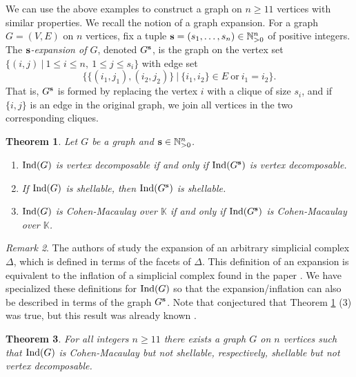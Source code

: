 \documentclass[12pt]{amsart}
\theoremstyle{plain}
\newtheorem{theorem}{Theorem}[section]
\theoremstyle{definition}
\theoremstyle{remark}
\newtheorem{remark}[theorem]{Remark}
\numberwithin{equation}{section}
\numberwithin{equation}{section}
\begin{document}
We can use the above examples to construct a graph on
$n \geq 11$ vertices with similar properties.  We
recall the notion of a graph expansion.  For
a graph $G=(V,E)$ on $n$ vertices, fix a tuple ${\bf s}=(s_1,\ldots,s_n) \in
\mathbb{N}^n_{> 0 }$ of positive integers.  The 
{\it ${\bf s}$-expansion of $G$}, denoted $G^{\bf s}$, is the 
graph on the vertex set 
$\{(i,j) ~|~ 1 \leq i \leq n, ~ 1 \leq j \leq s_i\}$
with edge set $$\{\{(i_1,j_1),(i_2,j_2)\} ~|~ \{i_1,i_2\} \in E ~\mbox{or}~ i_1=i_2\}.$$
That is, $G^{{\bf s}}$ is formed by replacing the vertex $i$ with a clique of
size $s_i$, and if $\{i,j\}$ is an edge in the original graph, we join
all vertices in the two corresponding cliques. 

\begin{theorem}\label{thm:expansion}
Let $G$ be a graph and ${\bf s} \in \mathbb{N}^n_{>0}$. 
\begin{enumerate}
    \item \cite[Theorem 2.7]{MKA2016} 
    ${\rm Ind}(G)$ is vertex decomposable if and only if 
    ${\rm Ind}(G^{\bf s})$ is 
    vertex decomposable.
    \item \cite[Theorem 2.12]{MKA2016} If ${\rm Ind}(G)$ is shellable, 
    then ${\rm Ind}(G^{\bf s})$ is shellable.
    \item \cite[Corollary 6.4]{BWW2005} \cite[Theorem 2.4]{RAM2016}
    ${\rm Ind}(G)$ is Cohen-Macaulay over $\mathbb{K}$ if and only if 
    ${\rm Ind}(G^{\bf s})$ is Cohen-Macaulay over $\mathbb{K}$.
\end{enumerate}
\end{theorem}

\begin{remark}
The authors of \cite{MKA2016,RAM2016} study the expansion
of an arbitrary simplicial complex $\Delta$, which is defined in terms
of the facets of $\Delta$.  This definition of an expansion is 
equivalent to the inflation of a simplicial complex found 
in the paper \cite{BWW2005}.  
We have specialized these definitions for ${\rm Ind}(G)$ so that the
expansion/inflation can also be described in terms of the graph $G^{\bf s}$.
Note that \cite{MKA2016} conjectured that Theorem \ref{thm:expansion} (3)
was true, but this result was already known \cite{BWW2005}.
\end{remark}


\begin{theorem}
    For all integers $n \geq 11$
    there exists a graph $G$ on $n$ vertices  such
        that ${\rm Ind}(G)$ is Cohen-Macaulay but not shellable,
        respectively, shellable but not vertex decomposable.
\end{theorem}
\end{document}
